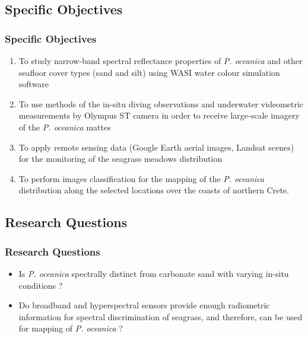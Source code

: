 \documentclass[pdflatex,compress,9pt,
	xcolor={dvipsnames,dvipsnames,svgnames,x11names,table},
	hyperref={colorlinks = true,breaklinks = true, urlcolor = NavyBlue, breaklinks = true}]{beamer}
\begin{document}
\subsection{Specific Objectives}
\begin{frame}\frametitle{Specific Objectives}
\begin{enumerate}
	\item To study narrow-band spectral reflectance properties of \emph{P. oceanica} and other seafloor cover types (sand and silt) using WASI water colour simulation software
	\item To use methods of the in-situ diving observations and underwater videometric measurements by Olympus ST camera in order to receive large-scale imagery of the \emph{P. oceanica} mattes
	\item To apply remote sensing data (Google Earth aerial images, Landsat scenes) for the monitoring of the seagrass meadows distribution
	\item To perform images classification for the mapping of the \emph{P. oceanica} distribution along the selected locations over the coasts of northern Crete.
\end{enumerate}
\end{frame}

\subsection{Research Questions}
\begin{frame}\frametitle{Research Questions}
\begin{itemize}
	\item Is \emph{P. oceanica} spectrally distinct from carbonate sand with varying in-situ conditions ?
	\item Do broadband and hyperspectral sensors provide enough radiometric information for spectral discrimination of seagrass, and therefore, can be used for mapping of \emph{P. oceanica} ?
\end{itemize}
\begin{figure}[H]
	\centering
			\hspace{1mm}
			\hspace{1mm}
\end{figure}
\end{frame}
\end{document}
